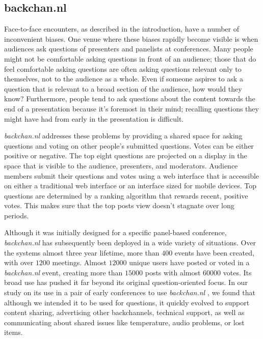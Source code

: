 \documentclass{tufte-handout}
\begin{document}

\subsection{backchan.nl}

Face-to-face encounters, as described in the introduction, have a number of inconvenient biases. One venue where these biases rapidly become visible is when audiences ask questions of presenters and panelists at conferences. Many people might not be comfortable asking questions in front of an audience; those that do feel comfortable asking questions are often asking questions relevant only to themselves, not to the audience as a whole. Even if someone aspires to ask a question that is relevant to a broad section of the audience, how would they know? Furthermore, people tend to ask questions about the content towards the end of a presentation because it's foremost in their mind; recalling questions they might have had from early in the presentation is difficult.

\emph{backchan.nl} addresses these problems by providing a shared space for asking questions and voting on other people's submitted questions. Votes can be either positive or negative. The top eight questions are projected on a display in the space that is visible to the audience, presenters, and moderators. Audience members submit their questions and votes using a web interface that is accessible on either a traditional web interface or an interface sized for mobile devices. Top questions are determined by a ranking algorithm that rewards recent, positive votes. This makes sure that the top posts view doesn't stagnate over long periods. 

Although it was initially designed for a specific panel-based conference, \emph{backchan.nl} has subsequently been deployed in a wide variety of situations. Over the systems almost three year lifetime, more than $400$ events have been created, with over $1200$ meetings. Almost $12000$ unique users have posted or voted in a \emph{backchan.nl} event, creating more than $15000$ posts with almost $60000$ votes. Its broad use has pushed it far beyond its original question-oriented focus. In our study on its use in a pair of early conferences to use \emph{backchan.nl} \citet{backchannl_chi}, we found that although we intended it to be used for questions, it quickly evolved to support content sharing, advertising other backchannels, technical support, as well as communicating about shared issues like temperature, audio problems, or lost items.
\end{document}
